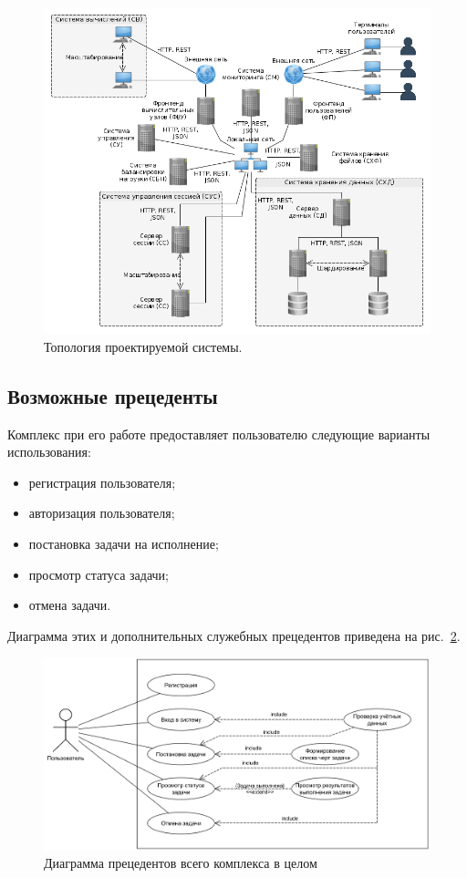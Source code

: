 \documentclass[a4paper,12pt]{report}
\numberwithin{equation}{section}
\begin{document}
  \begin{figure}
    \includegraphics[width=\linewidth]{diagrams/common/topology}
    \caption{Топология проектируемой системы.}
    \label{fig:common-topology}
  \end{figure}
  
  \subsection{Возможные прецеденты}
  Комплекс при его работе предоставляет пользователю следующие варианты использования:
  \begin{itemize}
    \item регистрация пользователя;
    \item авторизация пользователя;
    \item постановка задачи на исполнение;
    \item просмотр статуса задачи;
    \item отмена задачи.
  \end{itemize}
  
  Диаграмма этих и дополнительных служебных прецедентов приведена на рис.~\ref{fig:prec-common}.
  
  \begin{figure}[b]
    \centering
    \includegraphics[width=.9\linewidth]{diagrams/common/usecase}
    \caption{Диаграмма прецедентов всего комплекса в целом}
    \label{fig:prec-common}
  \end{figure}
  
\end{document}
